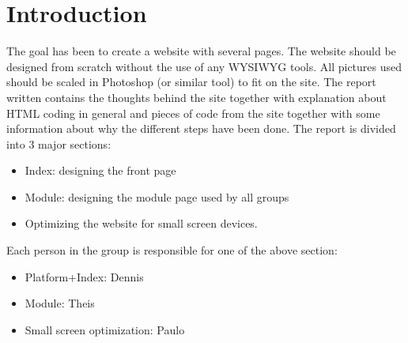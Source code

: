 \chapter{Introduction}
The goal has been to create a website with several pages. The website should be designed from scratch without the use of any WYSIWYG tools. All pictures used should be scaled in Photoshop (or similar tool) to fit on the site. The report written contains the thoughts behind the site together with explanation about HTML coding in general and pieces of code from the site together with some information about why the different steps have been done. 
The report is divided into 3 major sections:
\begin{itemize}
	\item Index: designing the front page
	\item Module: designing the module page used by all groups
	\item Optimizing the website for small screen devices.
\end{itemize}
Each person in the group is responsible for one of the above section:
\begin{itemize}
	\item Platform+Index: Dennis
	\item Module: Theis
	\item Small screen optimization: Paulo
\end{itemize}
